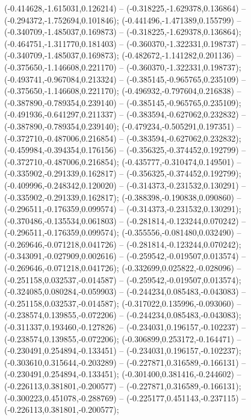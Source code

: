  (-0.414628,-1.615031,0.126214) -- (-0.318225,-1.629378,0.136864) -- (-0.294372,-1.752694,0.101846);
 (-0.441496,-1.471389,0.155799) -- (-0.340709,-1.485037,0.169873) -- (-0.318225,-1.629378,0.136864);
 (-0.464751,-1.311770,0.181403) -- (-0.360370,-1.322331,0.198737) -- (-0.340709,-1.485037,0.169873);
 (-0.482672,-1.141282,0.201136) -- (-0.375650,-1.146608,0.221170) -- (-0.360370,-1.322331,0.198737);
 (-0.493741,-0.967084,0.213324) -- (-0.385145,-0.965765,0.235109) -- (-0.375650,-1.146608,0.221170);
 (-0.496932,-0.797604,0.216838) -- (-0.387890,-0.789354,0.239140) -- (-0.385145,-0.965765,0.235109);
 (-0.491936,-0.641297,0.211337) -- (-0.383594,-0.627062,0.232832) -- (-0.387890,-0.789354,0.239140);
 (-0.479234,-0.505291,0.197351) -- (-0.372710,-0.487006,0.216854) -- (-0.383594,-0.627062,0.232832);
 (-0.459984,-0.394354,0.176156) -- (-0.356325,-0.374452,0.192799) -- (-0.372710,-0.487006,0.216854);
 (-0.435777,-0.310474,0.149501) -- (-0.335902,-0.291339,0.162817) -- (-0.356325,-0.374452,0.192799);
 (-0.409996,-0.248342,0.120020) -- (-0.314373,-0.231532,0.130291) -- (-0.335902,-0.291339,0.162817);
 (-0.388398,-0.190838,0.090860) -- (-0.296511,-0.176359,0.099574) -- (-0.314373,-0.231532,0.130291);
 (-0.370486,-0.135534,0.061803) -- (-0.281814,-0.123244,0.070242) -- (-0.296511,-0.176359,0.099574);
 (-0.355556,-0.081480,0.032490) -- (-0.269646,-0.071218,0.041726) -- (-0.281814,-0.123244,0.070242);
 (-0.343091,-0.027909,0.002616) -- (-0.259542,-0.019507,0.013574) -- (-0.269646,-0.071218,0.041726);
 (-0.332699,0.025822,-0.028096) -- (-0.251158,0.032537,-0.014587) -- (-0.259542,-0.019507,0.013574);
 (-0.324085,0.080284,-0.059903) -- (-0.244234,0.085483,-0.043083) -- (-0.251158,0.032537,-0.014587);
 (-0.317022,0.135996,-0.093060) -- (-0.238574,0.139855,-0.072206) -- (-0.244234,0.085483,-0.043083);
 (-0.311337,0.193460,-0.127826) -- (-0.234031,0.196157,-0.102237) -- (-0.238574,0.139855,-0.072206);
 (-0.306899,0.253172,-0.164471) -- (-0.230491,0.254894,-0.133451) -- (-0.234031,0.196157,-0.102237);
 (-0.303610,0.315644,-0.203289) -- (-0.227871,0.316589,-0.166131) -- (-0.230491,0.254894,-0.133451);
 (-0.301400,0.381416,-0.244602) -- (-0.226113,0.381801,-0.200577) -- (-0.227871,0.316589,-0.166131);
 (-0.300223,0.451078,-0.288769) -- (-0.225177,0.451143,-0.237115) -- (-0.226113,0.381801,-0.200577);
